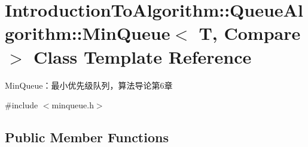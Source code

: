 \hypertarget{class_introduction_to_algorithm_1_1_queue_algorithm_1_1_min_queue}{}\section{Introduction\+To\+Algorithm\+:\+:Queue\+Algorithm\+:\+:Min\+Queue$<$ T, Compare $>$ Class Template Reference}
\label{class_introduction_to_algorithm_1_1_queue_algorithm_1_1_min_queue}


Min\+Queue：最小优先级队列，算法导论第6章  




{\ttfamily \#include $<$minqueue.\+h$>$}

\subsection*{Public Member Functions}
